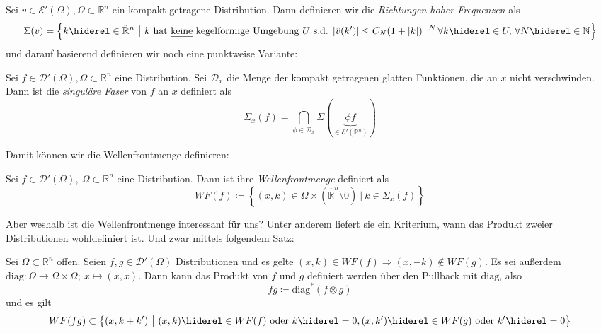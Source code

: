 \begin{definition}
\label{def:high_frequency_set}
Sei $v \in \mathcal{E}'(\Omega), \Omega \subset \mathbb{R}^n$ ein kompakt getragene Distribution. Dann definieren wir die \emph{Richtungen hoher Frequenzen} als
\begin{dmath*}
\Sigma (v) = \left\{k \hiderel \in \hat{\mathbb{R}}^n ~\big|~ k \textrm{ hat \emph{keine} kegelförmige Umgebung $U$ s.d. } \\ |\hat v (k')| \leq C_N(1+|k|)^{-N} \, \forall k \hiderel\in U,\, \forall N  \hiderel\in \mathbb{N} \right\}
\end{dmath*}
und darauf basierend definieren wir noch eine punktweise Variante:

Sei $f \in \mathcal{D}'(\Omega), \Omega \subset \mathbb{R}^n$ eine Distribution.
Sei $\mathcal{D}_x$ die Menge der kompakt getragenen glatten Funktionen, die an $x$ nicht verschwinden.
Dann ist die \emph{singuläre Faser} von $f$ an $x$ definiert als
\begin{dmath*}
\Sigma_x (f) = \bigcap \limits_{\phi \in \mathcal{D}_x} \Sigma (\underbrace{\phi f}_{\in \mathcal{E}'(\mathbb{R}^n)})
\end{dmath*}
\end{definition}

Damit können wir die Wellenfrontmenge definieren:

\begin{definition}[Wellenfrontmenge]
\label{def:wavefrontset}
Sei $f \in \mathcal{D}'(\Omega), ~\Omega \subset \mathbb{R}^n$ eine Distribution. Dann ist ihre \emph{Wellenfrontmenge} definiert als
\begin{equation*}
WF(f)  \coloneqq \left\{
	(x,k) \in \Omega \times (\hat{\mathbb{R}}^n \setminus 0)
	~\Big|~ k \in \Sigma_x(f)
	\right\}
\end{equation*}
\end{definition}

Aber weshalb ist die Wellenfrontmenge interessant für uns? Unter anderem liefert sie ein Kriterium, wann das Produkt zweier Distributionen wohldefiniert ist. Und zwar mittels folgendem Satz:

\begin{theorem}
\label{thm:hoermanders_criterion}
    Sei $\Omega \subset \mathbb{R}^n$ offen.
    Seien $f,g \in \mathcal{D}'(\Omega)$ Distributionen und es gelte $(x,k) \in WF(f) \Rightarrow (x,-k) \notin WF(g)$. Es sei außerdem $\mathrm{diag} : \Omega \rightarrow \Omega \times \Omega; ~x \mapsto (x,x)$. Dann kann das Produkt von $f$ und $g$ definiert werden über den Pullback mit $\mathrm{diag}$, also
    \begin{equation*}
        f g \coloneqq \mathrm{diag}^* (f \otimes g)
    \end{equation*}
    und es gilt
    \begin{dmath*}
        WF(fg) \subset \left\{(x,k+k') ~\big|~ (x,k) \hiderel\in WF(f) \textrm{ oder } k \hiderel = 0,\\ (x,k') \hiderel\in WF(g) \textrm{ oder } k'\hiderel=0 \right\}
    \end{dmath*}
\end{theorem}

